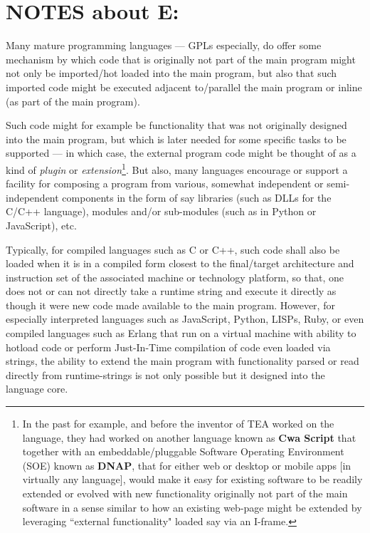 \documentclass[a4paper, 18pt]{book} %
\begin{document}
\section{NOTES about E:}
\label{SECNOTESE} 


Many mature programming languages --- GPLs especially, do offer some mechanism by which code that is originally not part of the main program might not only be imported/hot loaded into the main program, but also that such imported code might be executed adjacent to/parallel the main program or inline (as part of the main program). 

\vspace{1em}

Such code might for example be functionality that was not originally designed into the main program, but which is later needed for some specific tasks to be supported --- in which case, the external program code might be thought of as a kind of \textit{plugin} or \textit{extension}\footnote{In the past for example, and before the inventor of TEA worked on the language, they had worked on another language known as \textbf{Cwa Script} that together with an embeddable/pluggable Software Operating Environment (SOE)  known as \textbf{DNAP}\cite{lutalo2020dnap}, that for either web or desktop or mobile apps [in virtually any language], would make it easy for existing software to be readily extended or evolved with new functionality originally not part of the main software in a sense similar to how an existing web-page might be extended by leveraging ``external functionality" loaded say via an I-frame.}. But also, many languages encourage or support a facility for composing a program from various, somewhat independent or semi-independent components in the form of say libraries (such as DLLs for the C/C++ language), modules and/or sub-modules (such as in Python or JavaScript), etc.  

\vspace{1em}

Typically, for compiled languages such as C or C++, such code shall also be loaded when it is in a compiled form closest to the final/target architecture and instruction set of the associated machine or technology platform, so that, one does not or can not directly take a runtime string and execute it directly as though it were new code made available to the main program. However, for especially interpreted languages such as JavaScript, Python, LISPs, Ruby, or even compiled languages such as Erlang that run on a virtual machine with ability to hotload code or perform Just-In-Time compilation of code even loaded via strings, the ability to extend the main program with functionality parsed or read directly  from runtime-strings is not only possible but it designed into the language core.
\end{document}

